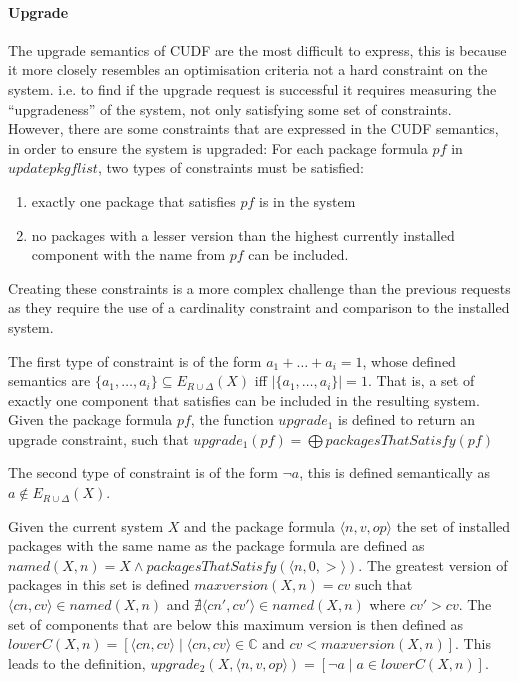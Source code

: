 \paragraph{Upgrade}
The upgrade semantics of CUDF are the most difficult to express, this is because it more closely resembles an optimisation criteria not a hard constraint on the system.
i.e. to find if the upgrade request is successful it requires measuring the ``upgradeness'' of the system, not only satisfying some set of constraints.
However, there are some constraints that are expressed in the CUDF semantics, in order to ensure the system is upgraded:
For each package formula $pf$ in $updatepkgflist$, two types of constraints must be satisfied:
\begin{enumerate}
  \item exactly one package that satisfies $pf$ is in the system
  \item no packages with a lesser version than the highest currently installed component with the name from $pf$ can be included.
\end{enumerate} 

Creating these constraints is a more complex challenge than the previous requests as they require the use of a cardinality constraint and comparison to the installed system. 

The first type of constraint is of the form $a_1 + \ldots + a_i = 1$, 
whose defined semantics are $\{a_1,\ldots,a_i\} \subseteq E_{R \cup \Delta}(X)$ iff $|\{a_1,\ldots,a_i\}| = 1$.
That is, a set of exactly one component that satisfies can be included in the resulting system.
Given the package formula $pf$, the function $upgrade_1$ is defined to return an upgrade constraint,
such that $upgrade_1(pf) = \bigoplus packagesThatSatisfy(pf)$

The second type of constraint is of the form $\neg a$,
this is defined semantically as $a \not \in E_{R \cup \Delta}(X)$.

Given the current system $X$ and the package formula $\langle n,v,op \rangle$ the set of installed packages with the same name as the package formula are defined as 
$named(X,n) = X \wedge packagesThatSatisfy(\langle n,0,> \rangle)$.
The greatest version of packages in this set is defined 
$maxversion(X,n) = cv$  such that $\langle cn,cv \rangle \in named(X,n)$ and $\nexists \langle cn',cv' \rangle \in named(X,n)$ where $cv' > cv$.
The set of components that are below this maximum version is then defined as
$lowerC(X,n) = [\langle cn,cv \rangle \mid \langle cn,cv \rangle \in \mathbb{C} \mbox{ and } cv < maxversion(X,n)]$.
This leads to the definition, $upgrade_2(X,\langle n,v,op \rangle) = [\neg a \mid a \in lowerC(X,n)]$.

